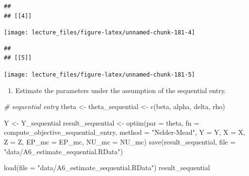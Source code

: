 \documentclass[
]{book}
\newenvironment{Shaded}{\begin{snugshade}}{\end{snugshade}}
\newcommand{\AttributeTok}[1]{\textcolor[rgb]{0.77,0.63,0.00}{#1}}
\newcommand{\CommentTok}[1]{\textcolor[rgb]{0.56,0.35,0.01}{\textit{#1}}}
\newcommand{\FunctionTok}[1]{\textcolor[rgb]{0.00,0.00,0.00}{#1}}
\newcommand{\NormalTok}[1]{#1}
\newcommand{\OtherTok}[1]{\textcolor[rgb]{0.56,0.35,0.01}{#1}}
\newcommand{\StringTok}[1]{\textcolor[rgb]{0.31,0.60,0.02}{#1}}
\providecommand{\tightlist}{%
  \setlength{\itemsep}{0pt}\setlength{\parskip}{0pt}}
\begin{document}
\begin{verbatim}
## 
## [[4]]
\end{verbatim}

\begin{center}\texttt{[image: lecture\_files/figure-latex/unnamed-chunk-181-4]} \end{center}

\begin{verbatim}
## 
## [[5]]
\end{verbatim}

\begin{center}\texttt{[image: lecture\_files/figure-latex/unnamed-chunk-181-5]} \end{center}

\begin{enumerate}
\def\labelenumi{\arabic{enumi}.}
\setcounter{enumi}{5}
\tightlist
\item
  Estimate the parameters under the assumption of the sequential entry.
\end{enumerate}

\begin{Shaded}
\begin{Highlighting}[]
\CommentTok{\# sequential entry}
\NormalTok{theta }\OtherTok{\textless{}{-}}\NormalTok{ theta\_sequential }\OtherTok{\textless{}{-}}
  \FunctionTok{c}\NormalTok{(beta, alpha, delta, rho)}
\end{Highlighting}
\end{Shaded}

\begin{Shaded}
\begin{Highlighting}[]
\NormalTok{Y }\OtherTok{\textless{}{-}}\NormalTok{ Y\_sequential}
\NormalTok{result\_sequential }\OtherTok{\textless{}{-}}
  \FunctionTok{optim}\NormalTok{(}\AttributeTok{par =}\NormalTok{ theta,}
        \AttributeTok{fn =}\NormalTok{ compute\_objective\_sequential\_entry,}
        \AttributeTok{method =} \StringTok{"Nelder{-}Mead"}\NormalTok{,}
        \AttributeTok{Y =}\NormalTok{ Y,}
        \AttributeTok{X =}\NormalTok{ X,}
        \AttributeTok{Z =}\NormalTok{ Z,}
        \AttributeTok{EP\_mc =}\NormalTok{ EP\_mc,}
        \AttributeTok{NU\_mc =}\NormalTok{ NU\_mc)}
\FunctionTok{save}\NormalTok{(result\_sequential, }\AttributeTok{file =} \StringTok{"data/A6\_estimate\_sequential.RData"}\NormalTok{)}
\end{Highlighting}
\end{Shaded}

\begin{Shaded}
\begin{Highlighting}[]
\FunctionTok{load}\NormalTok{(}\AttributeTok{file =} \StringTok{"data/A6\_estimate\_sequential.RData"}\NormalTok{)}
\NormalTok{result\_sequential}
\end{Highlighting}
\end{Shaded}
\end{document}

